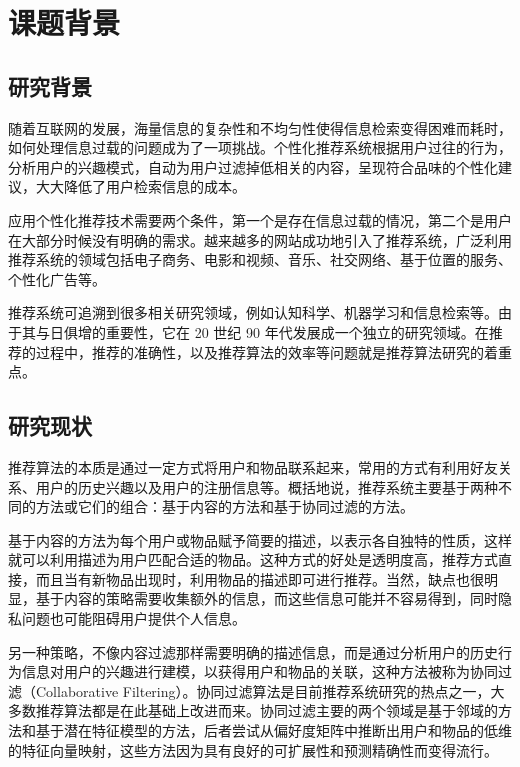 
\centerline{\textbf{}}
\bigskip

\chapter{课题背景}

\section{研究背景}
随着互联网的发展，海量信息的复杂性和不均匀性使得信息检索变得困难而耗时，如何处理信息过载的问题成为了一项挑战。个性化推荐系统根据用户过往的行为，分析用户的兴趣模式，自动为用户过滤掉低相关的内容，呈现符合品味的个性化建议，大大降低了用户检索信息的成本。

应用个性化推荐技术需要两个条件，第一个是存在信息过载的情况，第二个是用户在大部分时候没有明确的需求。越来越多的网站成功地引入了推荐系统，广泛利用推荐系统的领域包括电子商务、电影和视频、音乐、社交网络、基于位置的服务、个性化广告等。

推荐系统可追溯到很多相关研究领域，例如认知科学、机器学习和信息检索等\cite{肖力涛2016基于隐式因子和隐式主题的跨域推荐算法研究}。由于其与日俱增的重要性，它在 20 世纪 90 年代发展成一个独立的研究领域。在推荐的过程中，推荐的准确性，以及推荐算法的效率等问题就是推荐算法研究的着重点。


\section{研究现状} 
推荐算法的本质是通过一定方式将用户和物品联系起来，常用的方式有利用好友关系、用户的历史兴趣以及用户的注册信息等\cite{项亮2012推荐系统实践}。概括地说，推荐系统主要基于两种不同的方法或它们的组合：基于内容的方法和基于协同过滤的方法。

基于内容的方法为每个用户或物品赋予简要的描述，以表示各自独特的性质，这样就可以利用描述为用户匹配合适的物品。这种方式的好处是透明度高，推荐方式直接，而且当有新物品出现时，利用物品的描述即可进行推荐。当然，缺点也很明显，基于内容的策略需要收集额外的信息，而这些信息可能并不容易得到，同时隐私问题也可能阻碍用户提供个人信息\cite{Koren2009Matrix}。

另一种策略，不像内容过滤那样需要明确的描述信息，而是通过分析用户的历史行为信息对用户的兴趣进行建模，以获得用户和物品的关联，这种方法被称为协同过滤（Collaborative Filtering）\cite{Goldberg1992Using}。协同过滤算法是目前推荐系统研究的热点之一，大多数推荐算法都是在此基础上改进而来。协同过滤主要的两个领域是基于邻域的方法和基于潜在特征模型的方法，后者尝试从偏好度矩阵中推断出用户和物品的低维的特征向量映射，这些方法因为具有良好的可扩展性和预测精确性而变得流行。


